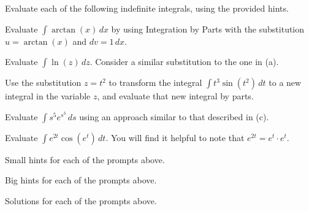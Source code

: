 \begin{activity} \label{A:5.4.2}  Evaluate each of the following indefinite integrals, using the provided hints.

\ba
	\item Evaluate $\int \arctan(x) \, dx$ by using Integration by Parts with the substitution $u = \arctan(x)$ and $dv = 1 \, dx$.
	\item Evaluate $\int \ln(z) \,dz$.  Consider a similar substitution to the one in (a).
	\item Use the substitution $z = t^2$ to transform the integral $\int t^3 \sin(t^2) \, dt$ to a new integral in the variable $z$, and evaluate that new integral by parts.
	\item Evaluate $\int s^5 e^{s^3} \, ds$ using an approach similar to that described in (c).
	\item Evaluate $\int e^{2t} \cos(e^t) \, dt$.  You will find it helpful to note that $e^{2t} = e^t \cdot e^t.$
\ea
\end{activity}
\begin{smallhint}
\ba
	\item Small hints for each of the prompts above.
\ea
\end{smallhint}
\begin{bighint}
\ba
	\item Big hints for each of the prompts above.
\ea
\end{bighint}
\begin{activitySolution}
\ba
	\item Solutions for each of the prompts above.
\ea
\end{activitySolution}
\aftera